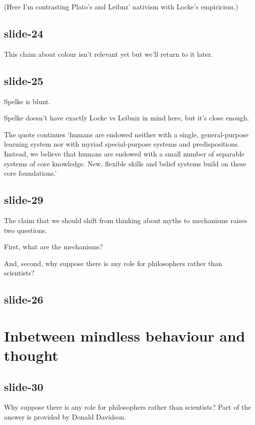 \documentclass[12pt,\papersize]{extarticle}
\begin{document}
(Here I'm contrasting Plato's and Leibnz' nativism with Locke's empiricism.)
 
 
 
\subsection{slide-24}
This claim about colour isn't relevant yet but we'll return to it later.
 
 
 
\subsection{slide-25}
Spelke is blunt.
 
Spelke doesn't have exactly Locke vs Leibniz in mind here, but it's close enough.
 
The quote continues ‘humans are endowed neither with a single, general-purpose learning system nor with myriad special-purpose systems and predispositions. Instead, we believe that humans are endowed with a small number of separable systems of core knowledge. New, flexible skills and belief systems build on these core foundations.’
 
 
 
\subsection{slide-29}
The claim that we should shift from thinking about myths to mechanisms raises two questions.
 
First, what are the mechanisms?
 
And, second, why suppose there is any role for philosophers rather than scientists?
 
 
 
\subsection{slide-26}
 
 
\section{Inbetween mindless behaviour and thought}
 
 
 
\subsection{slide-30}
Why suppose there is any role for philosophers rather than scientists? Part of the answer is provided by Donald Davidson.
 
\end{document}
